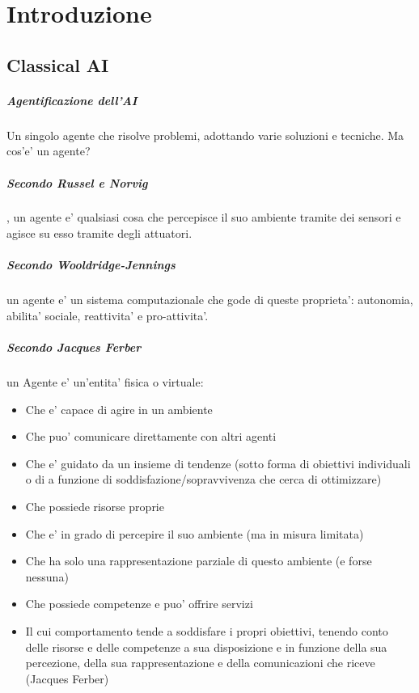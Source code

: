 \chapter{Introduzione}

\section{Classical AI}

\paragraph{Agentificazione dell'AI}

Un singolo agente che risolve problemi, adottando varie soluzioni e tecniche.
Ma cos'e' un agente?

\paragraph{Secondo Russel e Norvig}, un agente e' qualsiasi cosa che percepisce il suo ambiente tramite dei sensori e agisce su esso tramite degli attuatori.
\paragraph{Secondo Wooldridge-Jennings} un agente e' un sistema computazionale che gode di queste proprieta': autonomia, abilita' sociale, reattivita' e pro-attivita'.
\paragraph{Secondo Jacques Ferber} un Agente e' un’entita' fisica o virtuale:

\begin{itemize}
  \item Che e' capace di agire in un ambiente
  \item Che puo' comunicare direttamente con altri agenti
  \item Che e' guidato da un insieme di tendenze (sotto forma di obiettivi individuali o di a funzione di soddisfazione/sopravvivenza che cerca di ottimizzare)
  \item Che possiede risorse proprie
  \item Che e' in grado di percepire il suo ambiente (ma in misura limitata)
  \item Che ha solo una rappresentazione parziale di questo ambiente (e forse nessuna)
  \item Che possiede competenze e puo' offrire servizi
  \item Il cui comportamento tende a soddisfare i propri obiettivi, tenendo conto delle risorse e delle competenze a sua disposizione e in funzione della sua percezione, della sua rappresentazione e della comunicazioni che riceve (Jacques Ferber)
\end{itemize}

